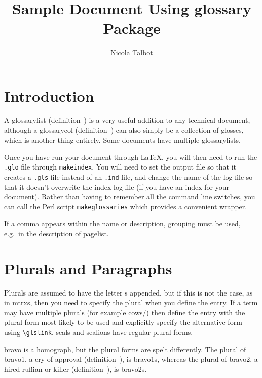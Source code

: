 \documentclass[a4paper]{report}
\begin{document}
\title{Sample Document Using glossary Package}
\author{Nicola Talbot}
\maketitle

\tableofcontents

\chapter{Introduction}

A \gls{glossarylist} (definition~) is a
very useful addition to any technical document, although a
\gls{glossarycol} (definition~) can also
simply be a collection of glosses, which is another thing entirely.
Some documents have multiple \glspl{glossarylist}.

Once you have run your document through \LaTeX, you
will then need to run the \texttt{.glo} file through
\texttt{makeindex}.  You will need to set the output
file so that it creates a \texttt{.gls} file instead
of an \texttt{.ind} file, and change the name of
the log file so that it doesn't overwrite the index
log file (if you have an index for your document).
Rather than having to remember all the command line
switches, you can call the \gls{Perl} script
\texttt{makeglossaries} which provides a convenient
wrapper.

If a comma appears within the name or description, grouping
must be used, e.g.\ in the description of \gls{pagelist}.

\chapter{Plurals and Paragraphs}

Plurals are assumed to have the letter s appended, but if this is
not the case, as in \glspl{mtrx}, then you need to specify the
plural when you define the entry. If a term may have multiple
plurals (for example \glspl{cow}/) then
define the entry with the plural form most likely to be used and
explicitly specify the alternative form using \verb|\glslink|.
\Glspl{seal} and \glspl{sealion} have regular plural forms.

\Gls{bravo} is a homograph, but the plural forms are spelt
differently. The plural of \gls{bravo1}, a cry of approval
(definition~), is \glspl{bravo1}, whereas the
plural of \gls{bravo2}, a hired ruffian or killer
(definition~), is \glspl{bravo2}.
\end{document}
